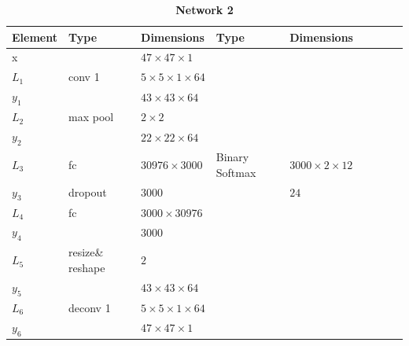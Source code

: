 
    \begin{table}[h!] \caption*{\textbf{Network 2}}
    \centering
    {\footnotesize
    \begin{tabular}{|lllllllll|}
    \hline
    \multicolumn{1}{|l|}{Element} & Type     & \multicolumn{1}{l|}{Dimensions}                     & Type     & \multicolumn{1}{l|}{Dimensions}  \\ \hline
    \multicolumn{1}{|l|}{x}       &          & \multicolumn{1}{l|}{$47\times47\times1$}            &          & \multicolumn{1}{l|}{}            \\ \hline
    \multicolumn{1}{|l|}{$L_1$}   & conv 1   & \multicolumn{1}{l|}{$5\times 5\times1\times 64$}    &          & \multicolumn{1}{l|}{}            \\
    \multicolumn{1}{|l|}{$y_1$}   &          & \multicolumn{1}{l|}{$43\times43\times64$}           &          & \multicolumn{1}{l|}{}            \\ \hline
    \multicolumn{1}{|l|}{$L_2$}   & max pool & \multicolumn{1}{l|}{$2\times 2$}                    &          & \multicolumn{1}{l|}{}            \\
    \multicolumn{1}{|l|}{$y_2$}   &          & \multicolumn{1}{l|}{$22\times22\times 64$}          &          & \multicolumn{1}{l|}{}            \\ \hline
    \multicolumn{1}{|l|}{$L_3$}   & fc       & \multicolumn{1}{l|}{$30976\times3000$}              & Binary
                                                                                                      Softmax & \multicolumn{1}{l|}{$3000\times2\times12$}        \\
    \multicolumn{1}{|l|}{$y_3$}   & dropout  & \multicolumn{1}{l|}{$3000$}                         &          & \multicolumn{1}{l|}{$24$}        \\ \hline
    \multicolumn{1}{|l|}{$L_4$}   & fc       & \multicolumn{1}{l|}{$3000\times30976$}              &          & \multicolumn{1}{l|}{}            \\
    \multicolumn{1}{|l|}{$y_4$}   &          & \multicolumn{1}{l|}{$3000$}                         &          & \multicolumn{1}{l|}{}            \\ \hline
    \multicolumn{1}{|l|}{$L_5$}   & resize\& reshape & \multicolumn{1}{l|}{$2$}                    &          & \multicolumn{1}{l|}{}            \\
    \multicolumn{1}{|l|}{$y_5$}   &            & \multicolumn{1}{l|}{$43\times43\times 64$}          &          & \multicolumn{1}{l|}{}            \\ \hline
    \multicolumn{1}{|l|}{$L_6$}   & deconv 1   & \multicolumn{1}{l|}{$5\times 5\times1\times 64$}  &          & \multicolumn{1}{l|}{}            \\
    \multicolumn{1}{|l|}{$y_6$}   &            & \multicolumn{1}{l|}{$47\times47\times1$}            &          & \multicolumn{1}{l|}{}             \\ \hline
    \end{tabular}

}
\end{table}
